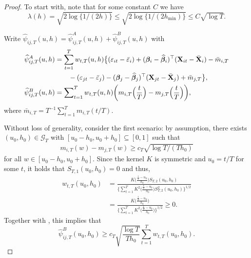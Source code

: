 \documentclass[a4paper,12pt]{article}
\makeatletter
\renewcommand{\eqref}[1]{\tagform@{\ref{#1}}}
\makeatother
\begin{document}
\begin{proof}
To start with, note that for some constant $C$ we have
\begin{equation}\label{eqA:power:lambda}
\lambda(h) = \sqrt{2\log\{1/(2h)\}} \le \sqrt{2\log\{1/(2h_{\min})\}} \le C \sqrt{\log T}.
\end{equation}

Write $\widehat{\psi}_{ij, T}(u,h) = \widehat{\psi}_{ij, T}^A(u,h) + \widehat{\psi}_{ij, T}^B(u,h)$ with 
\begin{align*}
\widehat{\psi}^A_{ij,T}(u,h) &= \sum_{t=1}^T w_{t,T}(u,h) \big\{ (\varepsilon_{it} - \bar{\varepsilon}_i) + (\bm{\beta}_i - \widehat{\bm{\beta}}_i)^\top (\mathbf{X}_{it} - \bar{\mathbf{X}}_{i}) - \bar{m}_{i, T} \\
& \quad \quad - (\varepsilon_{jt} - \bar{\varepsilon}_j) -  (\bm{\beta}_j - \widehat{\bm{\beta}}_j)^\top (\mathbf{X}_{jt} - \bar{\mathbf{X}}_{j}) + \bar{m}_{j, T} \big\},\\
\widehat{\psi}_{ij, T}^B(u,h) &= \sum\nolimits_{t=1}^T w_{t,T}(u,h) \bigg(m_{i, T}\Big(\frac{t}{T}\Big) - m_{j, T}\Big(\frac{t}{T}\Big) \bigg),
\end{align*}
where $\bar{m}_{i, T} = T^{-1} \sum_{t=1}^T m_{i, T} (t/T)$. 

Without loss of generality, consider the first scenario: by assumption, there exists $(u_0,h_0) \in \mathcal{G}_T$ with $[u_0-h_0,u_0+h_0] \subseteq [0,1]$ such that \begin{align}\label{eqA:power2}
m_{i,T}(w) - m_{j,T}(w) \ge c_T \sqrt{\log T/(Th_0)}
\end{align}
for all $w \in [u_0-h_0,u_0+h_0]$. Since the kernel $K$ is symmetric and $u_0 = t/T$ for some $t$, it holds that $S_{T,1}(u_0,h_0) = 0$ and thus,
\begin{align} w_{t,T}(u_0,h_0) &= \frac{K\Big(\frac{\frac{t}{T}-u_0}{h_0}\Big) S_{T, 2}(u_0, h_0)}{\Big\{ \sum_{t=1}^T K^2\Big(\frac{\frac{t}{T}-u_0}{h_0}\Big)S^2_{T, 2}(u_0, h_0) \Big\}^{1/2}} \\
&=\frac{K\Big(\frac{\frac{t}{T}-u_0}{h_0}\Big)}{\Big\{ \sum_{t=1}^T K^2\Big(\frac{\frac{t}{T}-u_0}{h_0}\Big)\Big\}^{1/2}} \ge 0.
\end{align}
Together with \eqref{eqA:power2}, this implies that 
\begin{equation}\label{eq1-proof-prop-test-power}
\widehat{\psi}_{ij, T}^B(u_0,h_0) \ge c_T \sqrt{\frac{\log T}{Th_0}} \sum\limits_{t=1}^T w_{t,T}(u_0,h_0).
\end{equation}


\end{proof}
\end{document}
